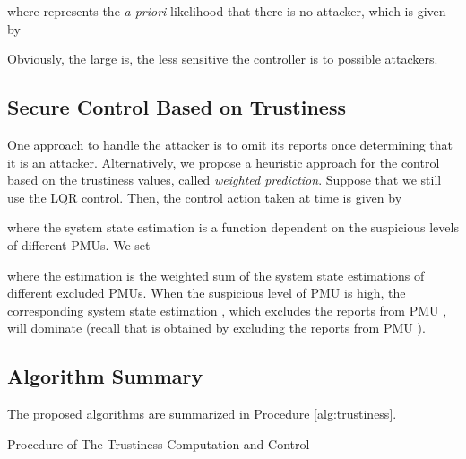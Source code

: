 \documentclass[journal,10pt,twocolumn]{IEEEtran}
\begin{document}
where  represents the {\em a priori} likelihood that there is no attacker, which is given by

Obviously, the large  is, the less sensitive the controller is to possible attackers.

\subsection{Secure Control Based on Trustiness}
One approach to handle the attacker is to omit its reports once determining that it is an attacker. Alternatively, we propose a heuristic approach for the control based on the trustiness values, called {\em weighted prediction}. Suppose that we still use the LQR control. Then, the control action taken at time  is given by

where the system state estimation is a function dependent on the suspicious levels of different PMUs. We set

where the estimation is the weighted sum of the system state estimations of different excluded PMUs. When the suspicious level of PMU  is high, the corresponding system state estimation , which excludes the reports from PMU , will dominate (recall that  is obtained by excluding the reports from PMU ).

\subsection{Algorithm Summary}
The proposed algorithms are summarized in Procedure \ref{alg:trustiness}.

\begin{procedure}[h]
\begin{center}
\caption{Procedure of The Trustiness Computation and Control}\label{alg:trustiness}
\begin{algorithmic}[1]
    \small
        \ENDFOR
    \ENDFOR
\end{algorithmic}
\end{center}
\end{procedure}
\end{document}
